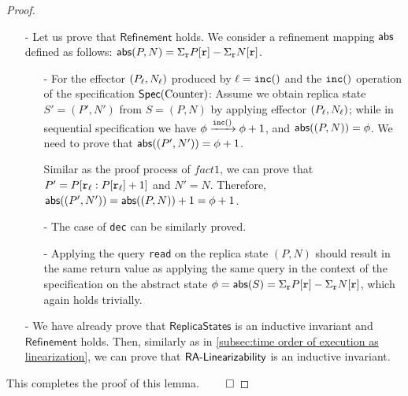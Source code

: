 \begin {proof}
\begin{itemize}
Since every operation is appended to the linearization when it executes atSource it clearly follows, the linearization order is consistent with visibility order. Then, by the causal delivery assumption, the order in which effectors are applied at a given replica is also consistent with the visibility order. Let $\alinord_1$ be the projection of linearization order into labels of effectors applied in a replica $\arep$, and $\alinord_2$ be the order of labels of effectors applied in replica $\arep$. By Lemma \ref{lemma:given two sequence consistent with visibility order, one can be obtained from the other}, $\alinord_2$ can be obtained from $\alinord_1$ by several time of swapping adjacent pair of concurrent operations. It is obvious that applying effectors of concurrent operations commute. Therefore, we know that $\mathsf{ReplicaStates}$ is an inductive invariant.


\item[-] Let us prove that $\mathsf{Refinement}$ holds. We consider a refinement mapping $\refmap$ defined as follows: $\refmap(P,N) = \Sigma_{\arep} P[\arep] - \Sigma_{\arep} N[\arep]$.

    \begin{itemize}
    \setlength{\itemsep}{0.5pt}
    \item[-] For the effector $(P_{\alabel},N_{\alabel})$ produced by $\alabel = \alabelshort[{\tt inc}]{}$ and the $\alabelshort[{\tt inc}]{}$ operation of the specification $\specCounter$: Assume we obtain replica state $S'=(P',N')$ from $S=(P,N)$ by applying effector $(P_{\alabel},N_{\alabel})$; while in sequential specification we have $\abstate \xrightarrow{\alabelshort[{\tt inc}]{}} \abstate+1$, and $\refmap((P,N)) = \abstate$. We need to prove that $\refmap((P',N')) = \abstate+1$.

        Similar as the proof process of $fact1$, we can prove that $P' = P[\arep_{\alabel}: P[\arep_{\alabel}]+1]$ and $N' = N$. Therefore, $\refmap((P',N')) = \refmap((P,N))+1 = \abstate+1$.

    \item[-] The case of {\tt dec} can be similarly proved.

    \item[-] Applying the query {\tt read} on the replica state $(P,N)$ should result in the same return value as applying the same query in the context of the specification on the abstract state $\abstate = \refmap(S) = \Sigma_{\arep} P[\arep] - \Sigma_{\arep} N[\arep]$, which again holds trivially.
    \end{itemize}

\item[-] We have already prove that $\mathsf{ReplicaStates}$ is an inductive invariant and $\mathsf{Refinement}$ holds. Then, similarly as in \sectionautorefname \ref{subsec:time order of execution as linearization}, we can prove that $\mathsf{\CRDTLinshort{}}$ is an inductive invariant.
\end{itemize}

This completes the proof of this lemma. $\qed$
\end {proof}








